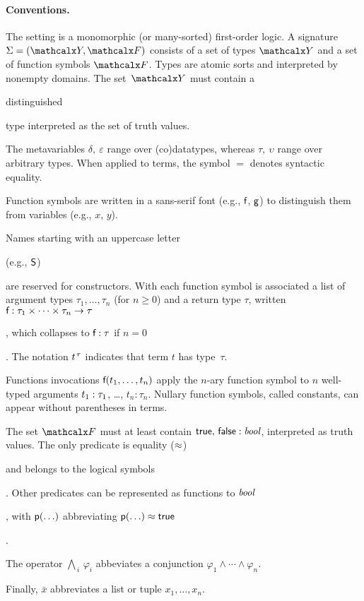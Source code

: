\begin{conf}
\kern-2.9pt %
\end{conf}

\paragraph{Conventions.}
The setting is a monomorphic (or many-sorted) first-order logic.
A signature $\Sig = (\Types, \Funcs)$ consists of a set of types $\Types$ and a
set of function symbols $\Funcs$. Types are atomic sorts and interpreted by
nonempty domains. The set~$\Types$ must contain a
\begin{rep}distinguished \end{rep}type  interpreted as the set of truth
values. %
\begin{rep}
The metavariables $\delta,\:\varepsilon$ range over (co)datatypes,
whereas $\tau,\:\upsilon$ range over arbitrary types.
When applied to terms, the symbol $=$ denotes syntactic equality.

Function symbols are written in a sans-serif font (e.g., $\textsf{f}$, $\textsf{g}$) to
distinguish them from variables (e.g., $x$, $y$).
\end{rep}
Names starting with an uppercase letter \begin{rep}(e.g.,
$\textsf{S}$) \end{rep}are reserved for constructors. With each function symbol 
is associated a list of argument types $\tau_1,\ldots,\tau_n$ (for $n \ge 0$)
and a return type $\tau$, written
$\textsf{f} : \tau_1 \times \cdots \times \tau_n \to \tau$\begin{rep},
which collapses to $\textsf{f} : \tau$ if $n = 0$\end{rep}.
The notation $t\typ{\tau}$ indicates that term $t$ has type~$\tau$.
\begin{rep}%
Functions invocations $\textsf{f}(t_1,\ldots,t_n)$
apply the $n$-ary function symbol
 to $n$ well-typed arguments $t_1 :\nobreak \tau_1$, \ldots, $t_n :
\tau_n$. Nullary function symbols, called constants, can appear without
parentheses in terms.
\end{rep}
The set $\Funcs$ must at least contain
$\textsf{true},\, \textsf{false} : \textit{bool}$, interpreted as truth values.
The only predicate is equality ($\approx$)\begin{rep} and belongs to the logical symbols\end{rep}.
Other predicates can be represented as functions to $\textit{bool}$\begin{rep},
with $\textsf{p}(\ldots)$ abbreviating $\textsf{p}(\ldots) \approx \textsf{true}$\end{rep}.
\begin{rep}The operator $\bigwedge_{\,i}\, \varphi_i$ abbeviates a conjunction
$\varphi_1 \mathrel\land \cdots \mathrel\land \varphi_n$. \end{rep}%
Finally, $\bar x$ abbreviates a list or tuple $x_1,\ldots,x_n$.

